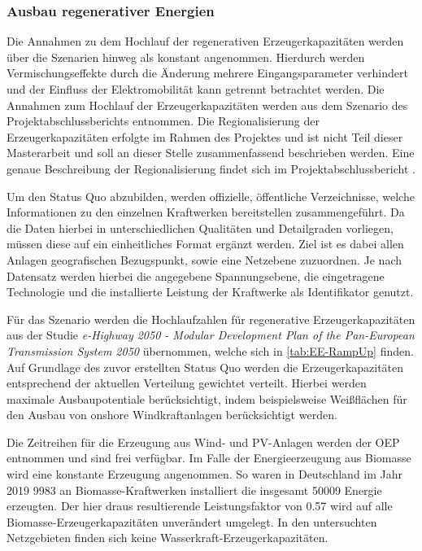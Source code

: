 \subsubsection{Ausbau regenerativer Energien}

Die Annahmen zu dem Hochlauf der regenerativen Erzeugerkapazitäten werden über die Szenarien hinweg als konstant angenommen.
Hierdurch werden Vermischungseffekte durch die Änderung mehrere Eingangsparameter verhindert und der Einfluss der Elektromobilität kann getrennt betrachtet werden.
Die Annahmen zum Hochlauf der Erzeugerkapazitäten werden aus dem Szenario \ego des \openego Projektabschlussberichts \cite{Mueller2019} entnommen.
Die Regionalisierung der Erzeugerkapazitäten erfolgte im Rahmen des \openego Projektes und ist nicht Teil dieser Masterarbeit und soll an dieser Stelle zusammenfassend beschrieben werden.
Eine genaue Beschreibung der Regionalisierung findet sich im \openego Projektabschlussbericht \cite{Mueller2019}.\medskip

Um den Status Quo abzubilden, werden offizielle, öffentliche Verzeichnisse, welche Informationen zu den einzelnen Kraftwerken bereitstellen zusammengeführt.
Da die Daten hierbei in unterschiedlichen Qualitäten und Detailgraden vorliegen, müssen diese auf ein einheitliches Format ergänzt werden.
Ziel ist es dabei allen Anlagen geografischen Bezugspunkt, sowie eine Netzebene zuzuordnen.
Je nach Datensatz werden hierbei die angegebene Spannungsebene, die eingetragene Technologie und die installierte Leistung der Kraftwerke als Identifikator genutzt.\medskip

Für das Szenario \ego werden die Hochlaufzahlen für regenerative Erzeugerkapazitäten aus der Studie \textit{e-Highway 2050 - Modular Development Plan of the Pan-European Transmission System 2050} \cite{EEHPG2015} übernommen, welche sich in \autoref{tab:EE-RampUp} finden.
Auf Grundlage des zuvor erstellten Status Quo werden die Erzeugerkapazitäten entsprechend der aktuellen Verteilung gewichtet verteilt.
Hierbei werden maximale Ausbaupotentiale berücksichtigt, indem beispielsweise Weißflächen für den Ausbau von onshore Windkraftanlagen berücksichtigt werden.



Die Zeitreihen für die Erzeugung aus Wind- und \gls{PV}-Anlagen werden der \gls{OEP} \cite{OEP} entnommen und sind frei verfügbar.
Im Falle der Energieerzeugung aus Biomasse wird eine konstante Erzeugung angenommen.
So waren in Deutschland im Jahr \num{2019} \SI{9983}{\mw} an Biomasse-Kraftwerken installiert die insgesamt \SI{50009}{\gwh} Energie erzeugten. \cite{BMWi2020}
Der hier draus resultierende Leistungsfaktor von \num{0.57} wird auf alle Biomasse-Erzeugerkapazitäten unverändert umgelegt.
In den untersuchten Netzgebieten finden sich keine Wasserkraft-Erzeugerkapazitäten.


